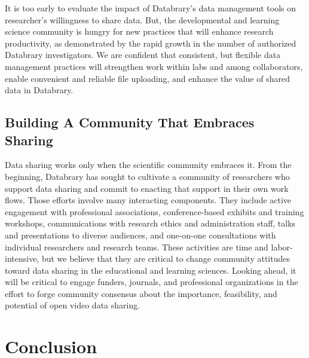 \documentclass[letterpaper,man,apacite]{apa6}
\begin{document}
It is too early to evaluate the impact of Databrary's data management tools on researcher's willingness to share data.
But, the developmental and learning science community is hungry for new practices that will enhance research productivity, as demonstrated by the rapid growth in the number of authorized Databrary investigators.
We are confident that consistent, but flexible data management practices will strengthen work within labs and among collaborators, enable convenient and reliable file uploading, and enhance the value of shared data in Databrary.

\subsection{Building A Community That Embraces Sharing}

Data sharing works only when the scientific community embraces it.
From the beginning, Databrary has sought to cultivate a community of researchers who support data sharing and commit to enacting that support in their own work flows.
Those efforts involve many interacting components.
They include active engagement with professional associations, conference-based exhibits and training workshops, communications with research ethics and administration staff, talks and presentations to diverse audiences, and one-on-one consultations with individual researchers and research teams.
These activities are time and labor-intensive, but we believe that they are critical to change community attitudes toward data sharing in the educational and learning sciences.
Looking ahead, it will be critical to engage funders, journals, and professional organizations in the effort to forge community consensus about the importance, feasibility, and potential of open video data sharing.

\section{Conclusion}
\end{document}
